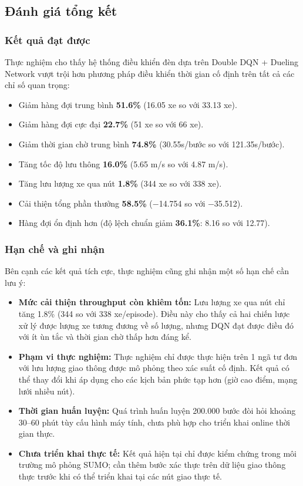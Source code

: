 \subsection{Đánh giá tổng kết}

\subsubsection{Kết quả đạt được}

Thực nghiệm cho thấy hệ thống điều khiển đèn dựa trên Double DQN + Dueling Network vượt trội hơn phương pháp điều khiển thời gian cố định trên tất cả các chỉ số quan trọng:

\begin{itemize}
    \item Giảm hàng đợi trung bình \textbf{51.6\%} (16.05 xe so với 33.13 xe).
    \item Giảm hàng đợi cực đại \textbf{22.7\%} (51 xe so với 66 xe).
    \item Giảm thời gian chờ trung bình \textbf{74.8\%} (30.55s/bước so với 121.35s/bước).
    \item Tăng tốc độ lưu thông \textbf{16.0\%} (5.65 m/s so với 4.87 m/s).
    \item Tăng lưu lượng xe qua nút \textbf{1.8\%} (344 xe so với 338 xe).
    \item Cải thiện tổng phần thưởng \textbf{58.5\%} ($-$14.754 so với $-$35.512).
    \item Hàng đợi ổn định hơn (độ lệch chuẩn giảm \textbf{36.1\%}: 8.16 so với 12.77).
\end{itemize}

\subsubsection{Hạn chế và ghi nhận}

Bên cạnh các kết quả tích cực, thực nghiệm cũng ghi nhận một số hạn chế cần lưu ý:

\begin{itemize}
    \item \textbf{Mức cải thiện throughput còn khiêm tốn:} Lưu lượng xe qua nút chỉ tăng 1.8\% (344 so với 338 xe/episode). Điều này cho thấy cả hai chiến lược xử lý được lượng xe tương đương về số lượng, nhưng DQN đạt được điều đó với ít ùn tắc và thời gian chờ thấp hơn đáng kể.

    \item \textbf{Phạm vi thực nghiệm:} Thực nghiệm chỉ được thực hiện trên 1 ngã tư đơn với lưu lượng giao thông được mô phỏng theo xác suất cố định. Kết quả có thể thay đổi khi áp dụng cho các kịch bản phức tạp hơn (giờ cao điểm, mạng lưới nhiều nút).

    \item \textbf{Thời gian huấn luyện:} Quá trình huấn luyện 200.000 bước đòi hỏi khoảng 30--60 phút tùy cấu hình máy tính, chưa phù hợp cho triển khai online thời gian thực.

    \item \textbf{Chưa triển khai thực tế:} Kết quả hiện tại chỉ được kiểm chứng trong môi trường mô phỏng SUMO; cần thêm bước xác thực trên dữ liệu giao thông thực trước khi có thể triển khai tại các nút giao thực tế.
\end{itemize}
